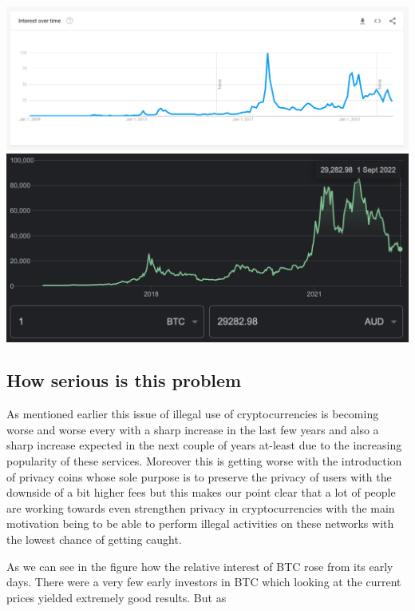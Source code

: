 \documentclass{article}
\begin{document}
\pagebreak

\includegraphics[width=1\linewidth]{BTC_Popularity.png}
\includegraphics[width=1\linewidth]{BTC_Price.png}

\pagebreak

\subsection{How serious is this problem}

As mentioned earlier this issue of illegal use of cryptocurrencies is becoming worse and worse every with a sharp increase in the last few years and also a sharp increase expected in the next couple of years at-least due to the increasing popularity of these services. Moreover this is getting worse with the introduction of privacy coins whose sole purpose is to preserve the privacy of users with the downside of a bit higher fees but this makes our point clear that a lot of people are working towards even strengthen privacy in cryptocurrencies with the main motivation being to be able to perform illegal activities on these networks with the lowest chance of getting caught. 

As we can see in the figure how the relative interest of BTC rose from its early days. There were a very few early investors in BTC which looking at the current prices yielded extremely good results. But as
\end{document}
